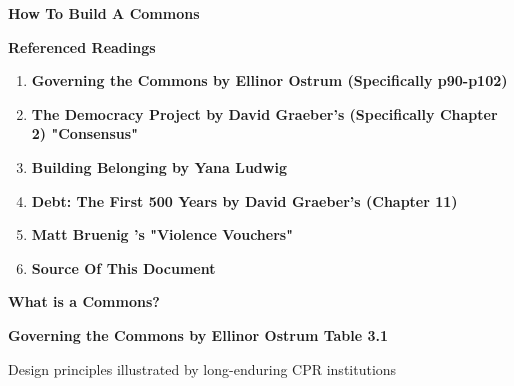 \documentclass{article}
\begin{document}
	
{\huge \textbf{How To Build A Commons}}


\vspace{1cm}

{\huge \textbf{Referenced Readings}}

\begin{multicols}{2}
\begin{enumerate}
	
	\item \textbf{ Governing the Commons  by Ellinor Ostrum (Specifically p90-p102) } 
	

	\item \textbf{The Democracy Project by David Graeber's  (Specifically Chapter 2)  "Consensus"} 
	
	
	\item \textbf{Building Belonging by Yana Ludwig} 
	
	
	\item \textbf{Debt: The First 500 Years by David Graeber's  (Chapter 11)} 
	
	
	\item \textbf{Matt Bruenig 's "Violence Vouchers"} 
	
	
	\item \textbf{Source Of This Document}
	
	
	 

	
\end{enumerate}
\end{multicols}

\pagebreak
{\huge \textbf{What is a Commons?}}

\textbf{Governing the Commons by Ellinor Ostrum Table 3.1}


Design principles illustrated by long-enduring CPR institutions
\end{document}
